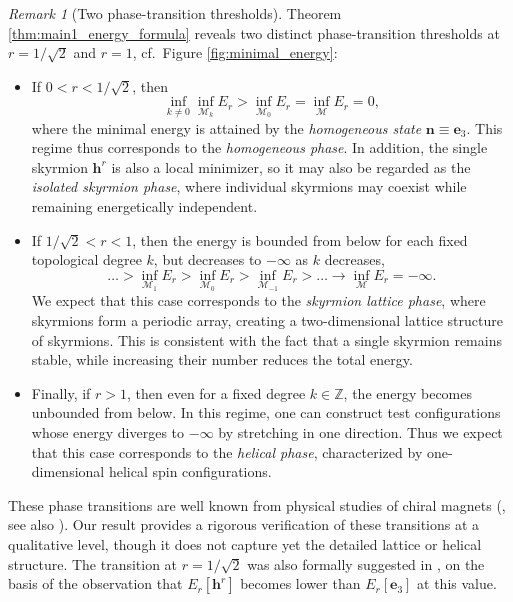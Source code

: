 \documentclass{amsart}
\numberwithin{equation}{section}
\theoremstyle{definition}
\theoremstyle{remark}
\newtheorem{remark}[theorem]{Remark}
\newcommand{\Z}{\mathbb{Z}}
\newcommand{\boM}{\mathcal{M}}
\newcommand{\bh}{{\mathbf{h}}}
\newcommand{\bn}{{\mathbf{n}}}
\newcommand{\boe}{{\mathbf{e}}}
\begin{document}
\begin{remark}[Two phase-transition thresholds]
    Theorem \ref{thm:main1_energy_formula} reveals two distinct phase-transition thresholds at $r=1/\sqrt{2}$ and $r=1$, cf.\ Figure \ref{fig:minimal_energy}:
    \begin{itemize}
        \item If $0<r<1/\sqrt{2}$, then 
        \[
        \inf_{k\neq0}\inf_{\boM_k}E_r > \inf_{\boM_0}E_r = \inf_{\boM}E_r=0,
        \]
        where the minimal energy is attained by the \emph{homogeneous state} $\bn\equiv \boe_3$.
        This regime thus corresponds to the \emph{homogeneous phase}.
        In addition, the single skyrmion $\bh^r$ is also a local minimizer, so it may also be regarded as the \emph{isolated skyrmion phase}, where individual skyrmions may coexist while remaining energetically independent.
        \item If $1/\sqrt{2}<r<1$, then the energy is bounded from below for each fixed topological degree $k$, but decreases to $-\infty$ as $k$ decreases,
        \[
        \dots>\inf_{\boM_1}E_r>\inf_{\boM_{0}}E_r>\inf_{\boM_{-1}}E_r>\dots \to \inf_{\boM}E_r = -\infty.
        \]
        We expect that this case corresponds to the \emph{skyrmion lattice phase}, where skyrmions form a periodic array, creating a two-dimensional lattice structure of skyrmions.
        This is consistent with the fact that a single skyrmion remains stable, while increasing their number reduces the total energy.
        \item Finally, if $r>1$, then even for a fixed degree $k\in\Z$, the energy becomes unbounded from below.
        In this regime, one can construct test configurations whose energy diverges to $-\infty$ by stretching in one direction.
        Thus we expect that this case corresponds to the \emph{helical phase}, characterized by one-dimensional helical spin configurations.
    \end{itemize}
    These phase transitions are well known from physical studies of chiral magnets (\cite{PhysRevB.89.094411,Gungordu2016}, see also \cite{BogHub94,BogHub94vortex,BogHub1999}). 
    Our result provides a rigorous verification of these transitions at a qualitative level, though it does not capture yet the detailed lattice or helical structure.
    The transition at $r=1/\sqrt{2}$ was also formally suggested in \cite{Ross2021}, on the basis of the observation that $E_r[\bh^r]$ becomes lower than $E_r[\boe_3]$ at this value.
\end{remark}
\end{document}
